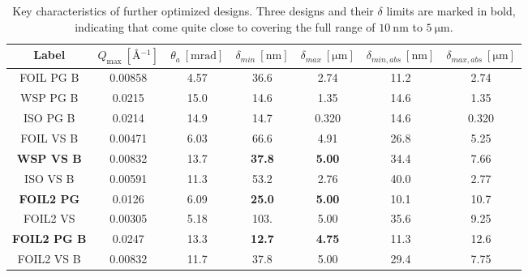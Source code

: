 \begin{table}[h!]
	\centering
	\begin{tabular}{c | c c c c | cc}
		\toprule
		Label & $Q_{\text{max}} ~[\unit{\angstrom^{-1}}]$ & $\theta_a~[\unit{\milli\radian}]$ & $\delta_{min}~[\unit{\nano\meter}]$ & $\delta_{max}~[\unit{\micro\meter}]$ & $\delta_{min,abs}~[\unit{\nano\meter}]$ & $\delta_{max,abs}~[\unit{\micro\meter}]$ \\
		\midrule
		FOIL PG B & \num{0.00858} & \num{4.57} & \num{36.6} & \num{2.74} & \num{11.2} & \num{2.74} \\
		WSP PG B & \num{0.0215} & \num{15.0} & \num{14.6} & \num{1.35} & \num{14.6} & \num{1.35} \\
		ISO PG B & \num{0.0214} & \num{14.9} & \num{14.7} & \num{0.320} & \num{14.6} & \num{0.320} \\
		FOIL VS B & \num{0.00471} & \num{6.03} & \num{66.6} & \num{4.91} & \num{26.8} & \num{5.25} \\
		\textbf{WSP VS B} & \num{0.00832} & \num{13.7} & \textbf{37.8} & \textbf{5.00} & \num{34.4} & \num{7.66} \\
		ISO VS B & \num{0.00591} & \num{11.3} & \num{53.2} & \num{2.76} & \num{40.0} & \num{2.77} \\
		\midrule
		\textbf{FOIL2 PG} & \num{0.0126} & \num{6.09} & \textbf{25.0} & \textbf{5.00} & \num{10.1} & \num{10.7} \\
		FOIL2 VS & \num{0.00305} & \num{5.18} & \num{103.} & \num{5.00} & \num{35.6} & \num{9.25} \\
		\textbf{FOIL2 PG B} & \num{0.0247} & \num{13.3} & \textbf{12.7} & \textbf{4.75} & \num{11.3} & \num{12.6} \\
		FOIL2 VS B & \num{0.00832} & \num{11.7} & \num{37.8} & \num{5.00} & \num{29.4} & \num{7.75} \\
		\bottomrule
	\end{tabular}
	\caption{Key characteristics of further optimized designs. Three designs and their $\delta$ limits are marked in bold, indicating that come quite close to covering the full range of $\SI{10}{\nano\meter}$ to $\SI{5}{\micro\meter}$.}
	\label{tab:optimized-designs-performance-detector-boost}
\end{table}


